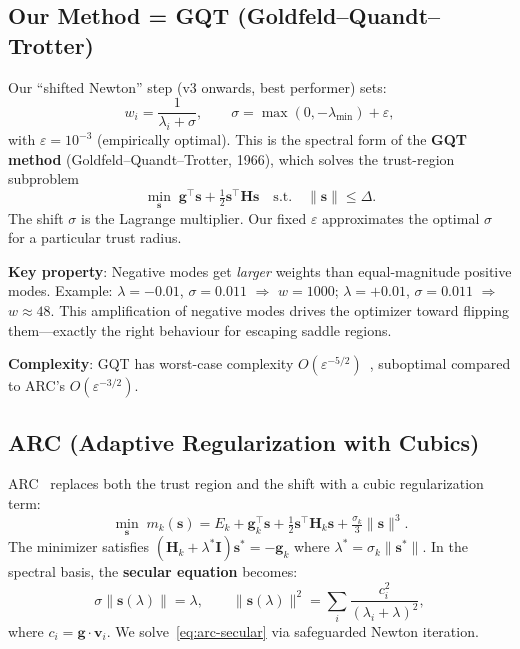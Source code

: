 \documentclass[11pt,a4paper]{article}
\newcommand{\vect}[1]{\bm{#1}}
\newcommand{\mat}[1]{\mathbf{#1}}
\newcommand{\norm}[1]{\lVert #1 \rVert}
\theoremstyle{definition}
\begin{document}
\subsection{Our Method = GQT (Goldfeld--Quandt--Trotter)}
\label{sec:gqt}

Our ``shifted Newton'' step (v3 onwards, best performer) sets:
\begin{equation}
  w_i = \frac{1}{\lambda_i + \sigma}, \qquad
  \sigma = \max(0, -\lambda_\text{min}) + \varepsilon,
  \label{eq:shifted-newton}
\end{equation}
with $\varepsilon = 10^{-3}$ (empirically optimal).
This is the spectral form of the \textbf{GQT method}
(Goldfeld--Quandt--Trotter, 1966), which solves the trust-region subproblem
\begin{equation}
  \min_{\vect{s}} \; \vect{g}^\top\vect{s} + \tfrac{1}{2}\vect{s}^\top\mat{H}\vect{s}
  \quad\text{s.t.}\quad \norm{\vect{s}} \leq \Delta.
\end{equation}
The shift $\sigma$ is the Lagrange multiplier.  Our fixed
$\varepsilon$ approximates the optimal $\sigma$ for a particular trust radius.

\textbf{Key property}: Negative modes get \emph{larger} weights than
equal-magnitude positive modes.  Example: $\lambda = -0.01$,
$\sigma = 0.011$ $\Rightarrow$ $w = 1000$; $\lambda = +0.01$,
$\sigma = 0.011$ $\Rightarrow$ $w \approx 48$.  This amplification of
negative modes drives the optimizer toward flipping them---exactly the right
behaviour for escaping saddle regions.

\textbf{Complexity}: GQT has worst-case complexity
$O(\varepsilon^{-5/2})$~\citep{cgt-optimal}, suboptimal compared to ARC's
$O(\varepsilon^{-3/2})$.

\subsection{ARC (Adaptive Regularization with Cubics)}
\label{sec:arc}

ARC~\citep{arc-part1} replaces both the trust region and the shift with a
cubic regularization term:
\begin{equation}
  \min_{\vect{s}} \; m_k(\vect{s}) = E_k + \vect{g}_k^\top\vect{s}
    + \tfrac{1}{2}\vect{s}^\top\mat{H}_k\vect{s}
    + \tfrac{\sigma_k}{3}\norm{\vect{s}}^3.
  \label{eq:arc-model}
\end{equation}
The minimizer satisfies $(\mat{H}_k + \lambda^*\mat{I})\vect{s}^* = -\vect{g}_k$
where $\lambda^* = \sigma_k\norm{\vect{s}^*}$.  In the spectral basis, the
\textbf{secular equation} becomes:
\begin{equation}
  \sigma \norm{\vect{s}(\lambda)} = \lambda,
  \qquad
  \norm{\vect{s}(\lambda)}^2 = \sum_i \frac{c_i^2}{(\lambda_i + \lambda)^2},
  \label{eq:arc-secular}
\end{equation}
where $c_i = \vect{g}\cdot\vect{v}_i$.  We solve~\eqref{eq:arc-secular}
via safeguarded Newton iteration.
\end{document}
